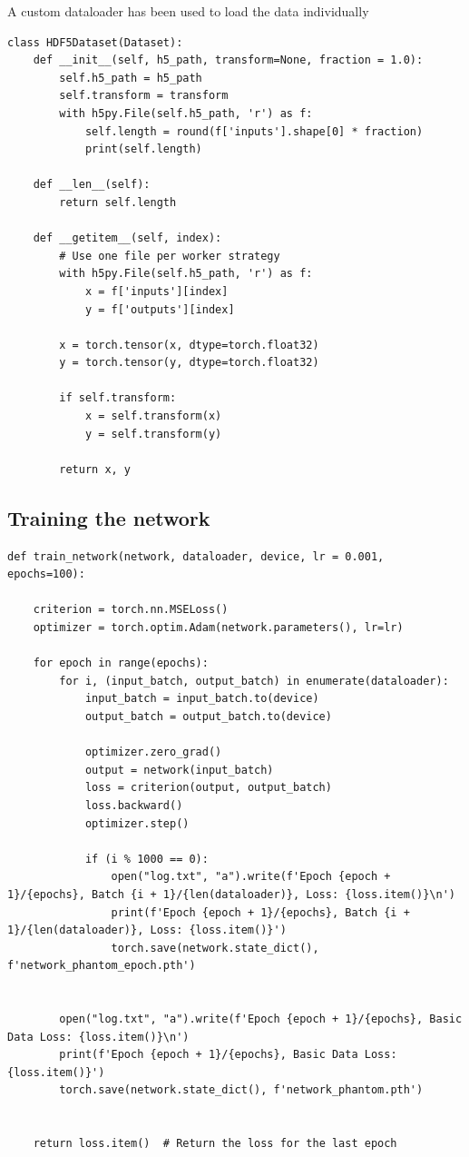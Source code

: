 A custom dataloader has been used to load the data individually

\begin{verbatim}
class HDF5Dataset(Dataset):
    def __init__(self, h5_path, transform=None, fraction = 1.0):
        self.h5_path = h5_path
        self.transform = transform
        with h5py.File(self.h5_path, 'r') as f:
            self.length = round(f['inputs'].shape[0] * fraction)
            print(self.length)

    def __len__(self):
        return self.length

    def __getitem__(self, index):
        # Use one file per worker strategy
        with h5py.File(self.h5_path, 'r') as f:
            x = f['inputs'][index]
            y = f['outputs'][index]

        x = torch.tensor(x, dtype=torch.float32)
        y = torch.tensor(y, dtype=torch.float32)

        if self.transform:
            x = self.transform(x)
            y = self.transform(y)

        return x, y
\end{verbatim}

\subsection{Training the network}

\begin{verbatim}
def train_network(network, dataloader, device, lr = 0.001, epochs=100):

    criterion = torch.nn.MSELoss()
    optimizer = torch.optim.Adam(network.parameters(), lr=lr)

    for epoch in range(epochs):
        for i, (input_batch, output_batch) in enumerate(dataloader):
            input_batch = input_batch.to(device)
            output_batch = output_batch.to(device)

            optimizer.zero_grad()
            output = network(input_batch)
            loss = criterion(output, output_batch)
            loss.backward()
            optimizer.step()

            if (i % 1000 == 0):
                open("log.txt", "a").write(f'Epoch {epoch + 1}/{epochs}, Batch {i + 1}/{len(dataloader)}, Loss: {loss.item()}\n')
                print(f'Epoch {epoch + 1}/{epochs}, Batch {i + 1}/{len(dataloader)}, Loss: {loss.item()}')
                torch.save(network.state_dict(), f'network_phantom_epoch.pth')


        open("log.txt", "a").write(f'Epoch {epoch + 1}/{epochs}, Basic Data Loss: {loss.item()}\n')
        print(f'Epoch {epoch + 1}/{epochs}, Basic Data Loss: {loss.item()}')
        torch.save(network.state_dict(), f'network_phantom.pth')


    return loss.item()  # Return the loss for the last epoch
\end{verbatim}